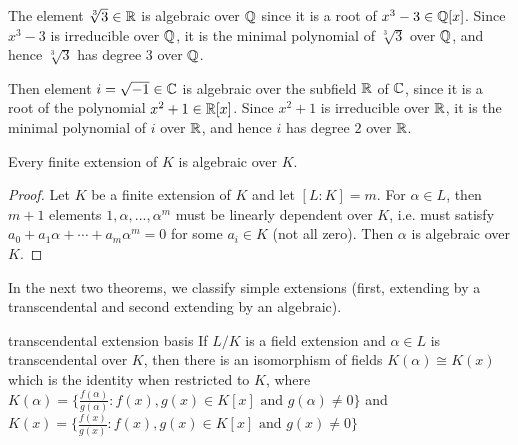 \begin{example}{}{}
    The element $\sqrt[3]{3}\in\mathbb{R}$ is algebraic over $\mathbb{Q}$ since it is a root of $x^3-3\in\mathbb{Q}[x]$.
    Since $x^3-3$ is irreducible over $\mathbb{Q}$, it is the minimal polynomial of $\sqrt[3]{3}$ over $\mathbb{Q}$,
    and hence $\sqrt[3]{3}$ has degree $3$ over $\mathbb{Q}$.
\end{example}

\begin{example}{}{}
    Then element $i=\sqrt{-1}\in\mathbb{C}$ is algebraic over the subfield $\mathbb{R}$ of $\mathbb{C}$, since it is a root of the polynomial $x^2+1\in\mathbb{R}[x]$.
    Since $x^2+1$ is irreducible over $\mathbb{R}$, it is the minimal polynomial of $i$ over $\mathbb{R}$,
    and hence $i$ has degree $2$ over $\mathbb{R}$.
\end{example}

\begin{proposition}{}{}
    Every finite extension of $K$ is algebraic over $K$.
\end{proposition}
\begin{proof}
    Let $K$ be a finite extension of $K$ and let $[L:K]=m$.
    For $\alpha\in L$, then $m+1$ elements $1,\alpha,...,\alpha^m$ must be linearly dependent over $K$, i.e. must satisfy $a_0+a_1\alpha+\cdots +a_m\alpha^m=0$
    for some $a_i\in K$ (not all zero). Then $\alpha$ is algebraic over $K$.
\end{proof}


In the next two theorems, we classify simple extensions (first, extending by
a transcendental and second extending by an algebraic).


\begin{theorem}{}{transcendental extension basis}
    If $L/K$ is a field extension and $\alpha\in L$ is transcendental over $K$,
    then there is an isomorphism of fields $K(\alpha)\cong K(x)$ which is the identity when restricted to $K$, 
    where $K(\alpha)=\{\frac{f(\alpha)}{g(\alpha)}:f(x),g(x)\in K[x] \text{ and } g(\alpha)\neq 0\}$
    and $K(x)=\{\frac{f(x)}{g(x)}:f(x),g(x)\in K[x] \text{ and } g(x)\neq 0\}$
\end{theorem}

